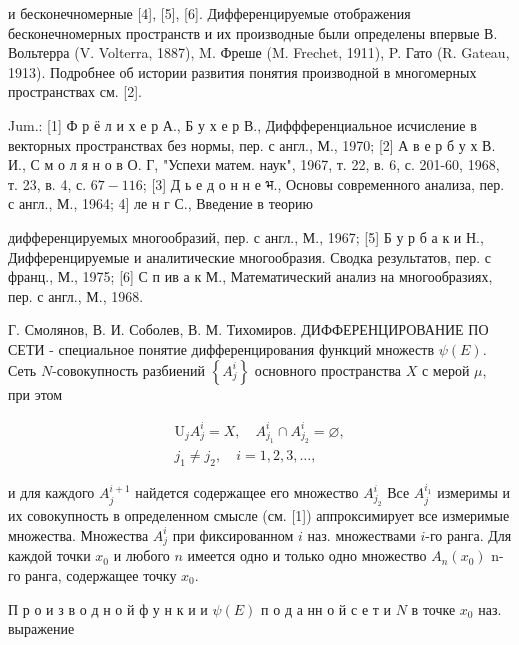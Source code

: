 \documentclass[10pt]{article}
\begin{document}
и бесконечномерные [4], [5], [6]. Дифференцируемые отображения бесконечномерных пространств и их производные были определены впервые В. Вольтерра (V. Volterra, 1887), M. Фреше (M. Frechet, 1911), P. Гато (R. Gateau, 1913). Подробнее об истории развития понятия производной в многомерных пространствах см. [2].



Jum.: [1] Ф р ё л и х е р А., Б у х е р В., Диффференциальное исчисление в векторных пространствах без нормы, пер. с англ., М., 1970; [2] А в е р б у х В. И., С м о л я н о в О. Г, "Успехи матем. наук", 1967, т. 22, в. 6, с. 201-60, 1968, т. 23, в. 4, с. $67-116$; [3] Д ь е д о н н е भ., Основы современного анализа, пер. с англ., М., 1964; 4$]$ ле н г С., Введение в теорию

дифференцируемых многообразий, пер. с англ., М., 1967; [5] Б у р б а к и Н., Дифференцируемые и аналитические многообразия. Сводка результатов, пер. с франц., М., 1975; [6] С п ив а к М., Математический анализ на многообразиях, пер. с англ., М., 1968.



Г. Смолянов, В. И. Соболев, В. М. Тихомиров. ДИФФЕРЕНЦИРОВАНИЕ ПО СЕТИ - специальное понятие дифференцирования функций множеств $\psi(E)$. Сеть $N$-совокупность разбиений $\left\{A_{j}^{i}\right\}$ основного пространства $X$ с мерой $\mu$, при этом



\[

\begin{gathered}

\mathrm{U}_{j} A_{j}^{i}=X, \quad A_{j_{1}}^{i} \cap A_{j_{2}}^{i}=\varnothing, \\

j_{1} \neq j_{2}, \quad i=1,2,3, \ldots,

\end{gathered}

\]



и для каждого $A_{j}^{i+1}$ найдется содержащее его множество $A_{j_{2}}^{i}$ Все $A_{j}^{i_{1}}$ измеримы и их совокупность в определенном смысле (см. [1]) аппроксимирует все измеримые множества. Множества $A_{j}^{i}$ при фиксированном $i$ наз. множествами $i$-го ранга. Для каждой точки $x_{0}$ и любого $n$ имеется одно и только одно множество $A_{n}\left(x_{0}\right)$ n-го ранга, содержащее точку $x_{0}$.



П р о и з в о д н о й ф у н к и и $\psi(E)$ п о д а нн о й с е т и $N$ в точке $x_{0}$ наз. выражение
\end{document}
